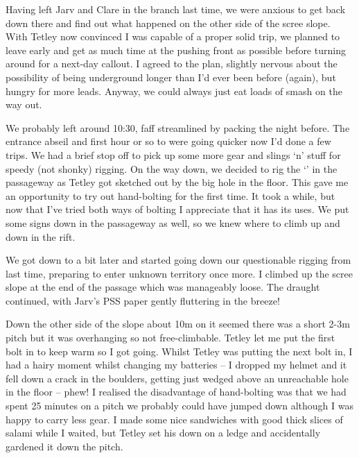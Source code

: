 Having left Jarv and Clare in the  branch last time, we were anxious to get back down there and find out what happened on the other side of the scree slope. With Tetley now convinced I was capable of a proper solid trip, we planned to leave early and get as much time at the pushing front as possible before turning around for a next-day callout. I agreed to the plan, slightly nervous about the possibility of being underground longer than I’d ever been before (again), but hungry for more leads. Anyway, we could always just eat loads of smash on the way out.

We probably left around 10:30, faff streamlined by packing the night before. The entrance abseil and first hour or so to  were going quicker now I’d done a few trips. We had a brief stop off to pick up some more gear and slings ‘n’ stuff for speedy (not shonky) rigging. On the way down, we decided to rig the ‘’ in the  passageway as Tetley got sketched out by the big hole in the floor. This gave me an opportunity to try out hand-bolting for the first time. It took a while, but now that I’ve tried both ways of bolting I appreciate that it has its uses. We put some signs down in the  passageway as well, so we knew where to climb up and down in the rift.

We got down to  a bit later and started going down our questionable rigging from last time, preparing to enter unknown territory once more. I climbed up the scree slope at the end of the passage which was manageably loose. The draught continued, with Jarv’s PSS paper gently fluttering in the breeze! 

Down the other side of the slope about 10m on it seemed there was a short 2-3m pitch but it was overhanging so not free-climbable. Tetley let me put the first bolt in to keep warm so I got going. Whilst Tetley was putting the next bolt in, I had a hairy moment whilst changing my batteries – I dropped my helmet and it fell down a crack in the boulders, getting just wedged above an unreachable hole in the floor – phew! I realised the disadvantage of hand-bolting was that we had spent 25 minutes on a pitch we probably could have jumped down although I was happy to carry less gear. I made some nice sandwiches with good thick slices of salami while I waited, but Tetley set his down on a ledge and accidentally gardened it down the pitch. 


